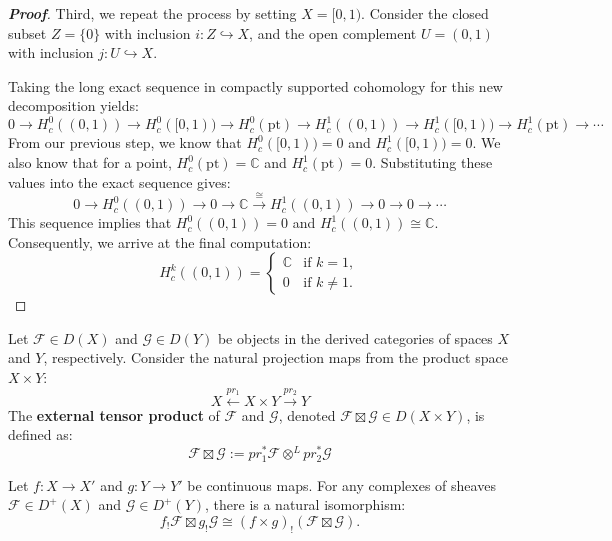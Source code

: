 \begin{proof}[\textbf{Proof}]
Third, we repeat the process by setting $X = [0,1)$. Consider the closed subset $Z = \{0\}$ with inclusion $i \colon Z \hookrightarrow X$, and the open complement $U = (0,1)$ with inclusion $j \colon U \hookrightarrow X$.

Taking the long exact sequence in compactly supported cohomology for this new decomposition yields:
\begin{equation*}
    0 \longrightarrow H_c^0((0,1)) \longrightarrow H_c^0([0,1)) \longrightarrow H_c^0(\text{pt}) \longrightarrow H_c^1((0,1)) \longrightarrow H_c^1([0,1)) \longrightarrow H_c^1(\text{pt}) \longrightarrow \cdots
\end{equation*}
From our previous step, we know that $H_c^0([0,1)) = 0$ and $H_c^1([0,1)) = 0$. We also know that for a point, $H_c^0(\text{pt}) = \mathbb{C}$ and $H_c^1(\text{pt}) = 0$. Substituting these values into the exact sequence gives:
\begin{equation*}
    0 \longrightarrow H_c^0((0,1)) \longrightarrow 0 \longrightarrow \mathbb{C} \xrightarrow{\cong} H_c^1((0,1)) \longrightarrow 0 \longrightarrow 0 \longrightarrow \cdots
\end{equation*}
This sequence implies that $H_c^0((0,1)) = 0$ and $H_c^1((0,1)) \cong \mathbb{C}$. Consequently, we arrive at the final computation:
\begin{equation*}
    H_c^k((0,1)) = 
    \begin{cases} 
        \mathbb{C} & \text{if } k = 1, \\ 
        0 & \text{if } k \neq 1. 
    \end{cases}
\end{equation*}
\end{proof}

Let $\mathcal{F} \in D(X)$ and $\mathcal{G} \in D(Y)$ be objects in the derived categories of spaces $X$ and $Y$, respectively. Consider the natural projection maps from the product space $X \times Y$:
\begin{equation*}
    X \xleftarrow{pr_1} X \times Y \xrightarrow{pr_2} Y
\end{equation*}
The \textbf{external tensor product} of $\mathcal{F}$ and $\mathcal{G}$, denoted $\mathcal{F} \boxtimes \mathcal{G} \in D(X \times Y)$, is defined as:
\begin{equation*}
    \mathcal{F} \boxtimes \mathcal{G} := pr_1^* \mathcal{F} \otimes^{L} pr_2^* \mathcal{G}
\end{equation*}

\begin{proposition}
Let $f \colon X \longrightarrow X'$ and $g \colon Y \longrightarrow Y'$ be continuous maps. For any complexes of sheaves $\mathcal{F} \in D^+(X)$ and $\mathcal{G} \in D^+(Y)$, there is a natural isomorphism:
\begin{equation*}
    f_! \mathcal{F} \boxtimes g_! \mathcal{G} \cong (f \times g)_! (\mathcal{F} \boxtimes \mathcal{G}).
\end{equation*}
\end{proposition}

